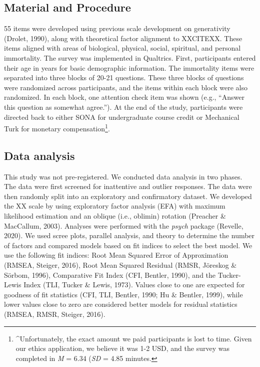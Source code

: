 \documentclass[
  english,
  man]{apa6}
\begin{document}
\subsection{Material and Procedure}\label{material-and-procedure}

55 items were developed using previous scale
development on generativity (Drolet, 1990), along with theoretical factor
alignment to XXCITEXX. These items aligned with areas of biological,
physical, social, spiritual, and personal immortality. The survey was
implemented in Qualtrics. First, participants entered their age in years
for basic demographic information. The immortality items were separated
into three blocks of 20-21 questions. These three blocks of questions
were randomized across participants, and the items within each block
were also randomized. In each block, one attention check item was shown
(e.g., ``Answer this question as somewhat agree.''). At the end of the
study, participants were directed back to either SONA for undergraduate
course credit or Mechanical Turk for monetary compensation\footnote{\^{}Unfortunately, the exact amount we paid participants is lost to
  time. Given our ethics application, we believe it was 1-2 USD, and
  the survey was completed in \emph{M} =
  6.34 (\emph{SD} =
  4.85 minutes.}.

\subsection{Data analysis}\label{data-analysis}

This study was not pre-registered. We conducted data analysis in two
phases. The data were first screened for inattentive and outlier
responses. The data were then randomly split into an exploratory and
confirmatory dataset. We developed the XX scale by using exploratory
factor analysis (EFA) with maximum likelihood estimation and an oblique
(i.e., oblimin) rotation (Preacher \& MacCallum, 2003). Analyses were performed with
the \emph{psych} package (Revelle, 2020). We used scree plots, parallel
analysis, and theory to determine the number of factors and compared
models based on fit indices to select the best model. We use the
following fit indices: Root Mean Squared Error of Approximation (RMSEA, Steiger, 2016), Root Mean Squared Residual (RMSR, Jöreskog \& Sörbom, 1996),
Comparative Fit Index (CFI, Bentler, 1990), and the Tucker-Lewis Index
(TLI, Tucker \& Lewis, 1973). Values close to one are expected for goodness of fit
statistics (CFI, TLI, Bentler, 1990; Hu \& Bentler, 1999), while lower values close
to zero are considered better models for residual statistics (RMSEA,
RMSR, Steiger, 2016).
\end{document}
